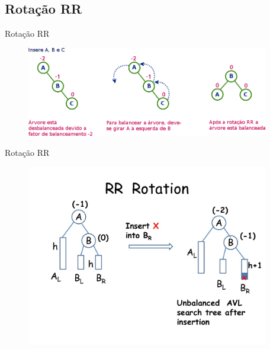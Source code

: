 \documentclass[aspectratio=169]{beamer}
\begin{document}
\subsection{Rotação RR}

\begin{frame}{Rotação RR}
\begin{figure}[!h]
  \centering
   \includegraphics[width=300pt]{imagens/rotacao_rr.png}
  \label{fig_rotacao_rr}
\end{figure}
\end{frame}


\begin{frame}{Rotação RR}
\begin{figure}[!h]
  \centering
  \includegraphics[width=300pt]{imagens/rr_rotation.png}
  \label{fig_rr_rotation}
\end{figure}
\end{frame}

\end{document}
